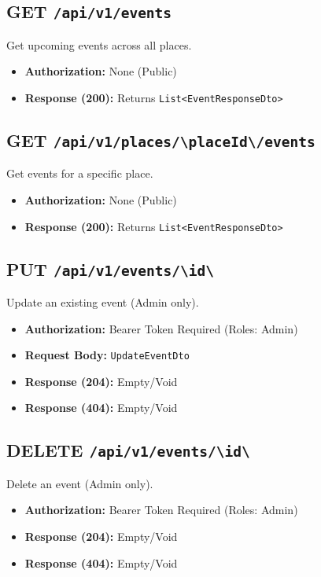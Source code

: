 \subsection{GET \texttt{/api/v1/events}}
Get upcoming events across all places.
\begin{itemize}
    \item \textbf{Authorization:} None (Public)
    \item \textbf{Response (200):} Returns \texttt{List<EventResponseDto>}
\end{itemize}

\subsection{GET \texttt{/api/v1/places/\textbackslash{}{placeId\textbackslash{}}/events}}
Get events for a specific place.
\begin{itemize}
    \item \textbf{Authorization:} None (Public)
    \item \textbf{Response (200):} Returns \texttt{List<EventResponseDto>}
\end{itemize}

\subsection{PUT \texttt{/api/v1/events/\textbackslash{}{id\textbackslash{}}}}
Update an existing event (Admin only).
\begin{itemize}
    \item \textbf{Authorization:} Bearer Token Required (Roles: Admin)
    \item \textbf{Request Body:} \texttt{UpdateEventDto}
    \item \textbf{Response (204):} Empty/Void
    \item \textbf{Response (404):} Empty/Void
\end{itemize}

\subsection{DELETE \texttt{/api/v1/events/\textbackslash{}{id\textbackslash{}}}}
Delete an event (Admin only).
\begin{itemize}
    \item \textbf{Authorization:} Bearer Token Required (Roles: Admin)
    \item \textbf{Response (204):} Empty/Void
    \item \textbf{Response (404):} Empty/Void
\end{itemize}

